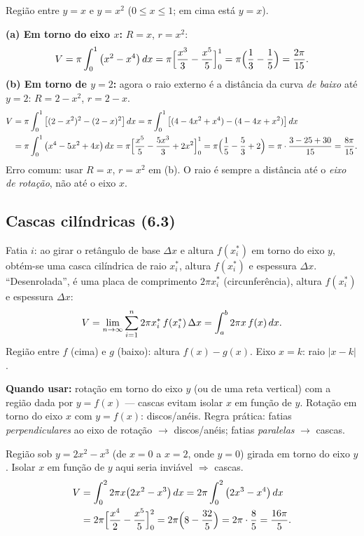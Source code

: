 \begin{exemplo}
Região entre $y=x$ e $y=x^2$ ($0\le x\le1$; em cima está $y=x$).

\textbf{(a) Em torno do eixo $x$:} $R=x$, $r=x^2$:
\[
V=\pi\int_0^1\big(x^2-x^4\big)\,dx=\pi\Big[\frac{x^3}{3}-\frac{x^5}{5}\Big]_0^1=\pi\Big(\frac13-\frac15\Big)=\frac{2\pi}{15}.
\]
\textbf{(b) Em torno de $y=2$:} agora o raio externo é a distância da curva \emph{de baixo} até $y=2$: $R=2-x^2$, $r=2-x$.
\begin{align*}
V&=\pi\int_0^1\big[(2-x^2)^2-(2-x)^2\big]\,dx=\pi\int_0^1\big[(4-4x^2+x^4)-(4-4x+x^2)\big]\,dx\\
&=\pi\int_0^1\big(x^4-5x^2+4x\big)\,dx
=\pi\Big[\frac{x^5}{5}-\frac{5x^3}{3}+2x^2\Big]_0^1=\pi\Big(\frac15-\frac53+2\Big)=\pi\cdot\frac{3-25+30}{15}=\frac{8\pi}{15}.
\end{align*}
Erro comum: usar $R=x$, $r=x^2$ em (b). O raio é sempre a distância até o \emph{eixo de rotação}, não até o eixo $x$.
\end{exemplo}

\subsection{Cascas cilíndricas (6.3)}

\begin{definicao}[{Volume por cascas --- girar em torno do eixo $y$ a região sob $y=f(x)$, $0\le a\le x\le b$}]
Fatia $i$: ao girar o retângulo de base $\Delta x$ e altura $f(x_i^*)$ em torno do eixo $y$, obtém-se uma casca cilíndrica de raio $x_i^*$, altura $f(x_i^*)$ e espessura $\Delta x$. ``Desenrolada'', é uma placa de comprimento $2\pi x_i^*$ (circunferência), altura $f(x_i^*)$ e espessura $\Delta x$:
\[
V=\lim_{n\to\infty}\sum_{i=1}^n 2\pi x_i^*\,f(x_i^*)\,\Delta x=\int_a^b 2\pi x\,f(x)\,dx .
\]
Região entre $f$ (cima) e $g$ (baixo): altura $f(x)-g(x)$. Eixo $x=k$: raio $|x-k|$.

\textbf{Quando usar:} rotação em torno do eixo $y$ (ou de uma reta vertical) com a região dada por $y=f(x)$ --- cascas evitam isolar $x$ em função de $y$. Rotação em torno do eixo $x$ com $y=f(x)$: discos/anéis. Regra prática: fatias \emph{perpendiculares} ao eixo de rotação $\to$ discos/anéis; fatias \emph{paralelas} $\to$ cascas.
\end{definicao}

\begin{exemplo}
Região sob $y=2x^2-x^3$ (de $x=0$ a $x=2$, onde $y=0$) girada em torno do eixo $y$. Isolar $x$ em função de $y$ aqui seria inviável $\Rightarrow$ cascas.
\begin{align*}
V&=\int_0^2 2\pi x\big(2x^2-x^3\big)\,dx=2\pi\int_0^2\big(2x^3-x^4\big)\,dx\\
&=2\pi\Big[\frac{x^4}{2}-\frac{x^5}{5}\Big]_0^2=2\pi\Big(8-\frac{32}{5}\Big)=2\pi\cdot\frac85=\frac{16\pi}{5}.
\end{align*}
\end{exemplo}

